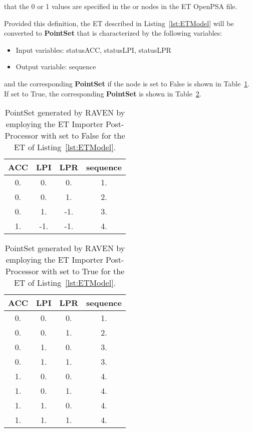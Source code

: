 \nb that the 0 or 1 values are specified in the  or  nodes in the ET OpenPSA file.

Provided this definition, the ET described in Listing~\ref{lst:ETModel} will be converted to \textbf{PointSet} that is characterized
by the following variables:
\begin{itemize}
	\item Input variables: statusACC, statusLPI, statusLPR
	\item Output variable: sequence
\end{itemize}
and the corresponding \textbf{PointSet} if the  node is set to False is shown in Table~\ref{PointSetETExpandFalse}.
If  set to True, the corresponding \textbf{PointSet} is shown in Table~\ref{PointSetETExpandTrue}.
\begin{table}[h]
    \centering
    \caption{PointSet generated by RAVEN by employing the ET Importer Post-Processor with 
             set to False for the ET of Listing~\ref{lst:ETModel}.}
    \label{PointSetETExpandFalse}
	\begin{tabular}{c | c | c | c}
		\hline
		ACC & LPI & LPR & sequence \\
		\hline
		0.  &  0. &  0. & 1. \\
		0.  &  0. &  1. & 2. \\
		0.  &  1. & -1. & 3. \\
		1.  & -1. & -1. & 4. \\
		\hline
	\end{tabular}
\end{table}
\begin{table}[h]
    \centering
    \caption{PointSet generated by RAVEN by employing the ET Importer Post-Processor with 
             set to True for the ET of Listing~\ref{lst:ETModel}.}
    \label{PointSetETExpandTrue}
	\begin{tabular}{c | c | c | c}
		\hline
		ACC & LPI & LPR & sequence \\
		\hline
		0.  &  0. &  0. & 1. \\
		0.  &  0. &  1. & 2. \\
		0.  &  1. &  0. & 3. \\
		0.  &  1. &  1. & 3. \\
		1.  &  0. &  0. & 4. \\
		1.  &  0. &  1. & 4. \\
		1.  &  1. &  0. & 4. \\
		1.  &  1. &  1. & 4. \\
		\hline
	\end{tabular}
\end{table}

